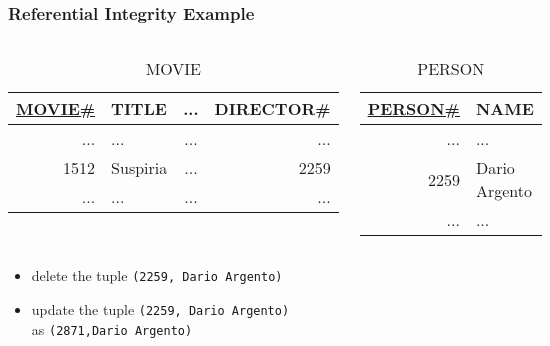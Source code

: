 \documentclass[dvipsnames]{beamer}
\theoremstyle{plain}
\begin{document}
\begin{frame}
  \frametitle{Referential Integrity Example}

  \begin{example}
    \begin{columns}
      \begin{tiny}
      \begin{table}
        \caption{MOVIE}
        \begin{tabular}{|r|l|c|r|}\hline
\underline{MOVIE\#} & TITLE & ... & DIRECTOR\#\\[2pt]\hline\hline
             ... & ...      & ... &        ...\\\hline
            1512 & Suspiria & ... &       2259\\\hline
             ... & ...      & ... &        ...\\\hline
        \end{tabular}
      \end{table}
      \end{tiny}

      \begin{tiny}
      \begin{table}
        \caption{PERSON}
        \begin{tabular}{|r|l|}\hline
\underline{PERSON\#} & NAME\\[2pt]\hline\hline
        ... & ...          \\\hline
       2259 & Dario Argento\\\hline
        ... & ...          \\\hline
        \end{tabular}
      \end{table}
      \end{tiny}
    \end{columns}

    \pause
    \begin{itemize}
      \item delete the tuple \texttt{(2259, Dario Argento)}
      \item update the tuple \texttt{(2259, Dario Argento)}\\
        as \texttt{(2871,Dario Argento)}
    \end{itemize}
  \end{example}
\end{frame}
\end{document}
